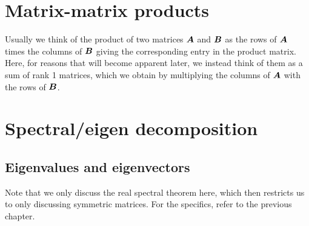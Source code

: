 \documentclass{report}
\begin{document}
	\section{Matrix-matrix products}
	Usually we think of the product of two matrices $\boldsymbol{A}$ and $\boldsymbol{B}$ as the rows of $\boldsymbol{A}$ times the columns of $\boldsymbol{B}$ giving the corresponding entry in the product matrix. Here, for reasons that will become apparent later, we instead think of them as a sum of rank 1 matrices, which we obtain by multiplying the columns of $\boldsymbol{A}$ with the rows of $\boldsymbol{B}$.\\
	
	\section{Spectral/eigen decomposition}
	\subsection{Eigenvalues and eigenvectors}
	\vspace{2mm}
	Note that we only discuss the real spectral theorem here, which then restricts us to only discussing symmetric matrices. For the specifics, refer to the previous chapter.
	\pagebreak
\end{document}
